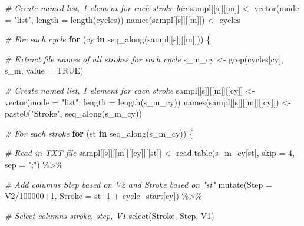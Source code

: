 \documentclass[
]{article}
\newenvironment{Shaded}{\begin{snugshade}}{\end{snugshade}}
\newcommand{\AttributeTok}[1]{\textcolor[rgb]{0.77,0.63,0.00}{#1}}
\newcommand{\CommentTok}[1]{\textcolor[rgb]{0.56,0.35,0.01}{\textit{#1}}}
\newcommand{\ConstantTok}[1]{\textcolor[rgb]{0.00,0.00,0.00}{#1}}
\newcommand{\ControlFlowTok}[1]{\textcolor[rgb]{0.13,0.29,0.53}{\textbf{#1}}}
\newcommand{\DecValTok}[1]{\textcolor[rgb]{0.00,0.00,0.81}{#1}}
\newcommand{\FunctionTok}[1]{\textcolor[rgb]{0.00,0.00,0.00}{#1}}
\newcommand{\NormalTok}[1]{#1}
\newcommand{\OtherTok}[1]{\textcolor[rgb]{0.56,0.35,0.01}{#1}}
\newcommand{\SpecialCharTok}[1]{\textcolor[rgb]{0.00,0.00,0.00}{#1}}
\newcommand{\StringTok}[1]{\textcolor[rgb]{0.31,0.60,0.02}{#1}}
\begin{document}
\begin{Shaded}
\begin{Highlighting}[]
    \CommentTok{\# Create named list, 1 element for each stroke bin}
\NormalTok{    sampl[[s]][[m]] }\OtherTok{\textless{}{-}} \FunctionTok{vector}\NormalTok{(}\AttributeTok{mode =} \StringTok{"list"}\NormalTok{, }\AttributeTok{length =} \FunctionTok{length}\NormalTok{(cycles))}
    \FunctionTok{names}\NormalTok{(sampl[[s]][[m]]) }\OtherTok{\textless{}{-}}\NormalTok{ cycles}
    
    \CommentTok{\# For each cycle}
    \ControlFlowTok{for}\NormalTok{ (cy }\ControlFlowTok{in} \FunctionTok{seq\_along}\NormalTok{(sampl[[s]][[m]])) \{}
      
      \CommentTok{\# Extract file names of all strokes for each cycle}
\NormalTok{      s\_m\_cy }\OtherTok{\textless{}{-}} \FunctionTok{grep}\NormalTok{(cycles[cy], s\_m, }\AttributeTok{value =} \ConstantTok{TRUE}\NormalTok{)}
     
      \CommentTok{\# Create named list, 1 element for each stroke}
\NormalTok{      sampl[[s]][[m]][[cy]] }\OtherTok{\textless{}{-}} \FunctionTok{vector}\NormalTok{(}\AttributeTok{mode =} \StringTok{"list"}\NormalTok{, }\AttributeTok{length =} \FunctionTok{length}\NormalTok{(s\_m\_cy))}
      \FunctionTok{names}\NormalTok{(sampl[[s]][[m]][[cy]]) }\OtherTok{\textless{}{-}} \FunctionTok{paste0}\NormalTok{(}\StringTok{"Stroke"}\NormalTok{, }\FunctionTok{seq\_along}\NormalTok{(s\_m\_cy))}
      
      \CommentTok{\# For each stroke}
      \ControlFlowTok{for}\NormalTok{ (st }\ControlFlowTok{in} \FunctionTok{seq\_along}\NormalTok{(s\_m\_cy)) \{}
     
        \CommentTok{\# Read in TXT file}
\NormalTok{        sampl[[s]][[m]][[cy]][[st]] }\OtherTok{\textless{}{-}} \FunctionTok{read.table}\NormalTok{(s\_m\_cy[st], }\AttributeTok{skip =} \DecValTok{4}\NormalTok{, }\AttributeTok{sep =} \StringTok{";"}\NormalTok{) }\SpecialCharTok{\%\textgreater{}\%} 
          
          \CommentTok{\# Add columns Step based on V2 and Stroke based on "st"}
          \FunctionTok{mutate}\NormalTok{(}\AttributeTok{Step =}\NormalTok{ V2}\SpecialCharTok{/}\DecValTok{100000}\SpecialCharTok{+}\DecValTok{1}\NormalTok{, }\AttributeTok{Stroke =}\NormalTok{ st }\SpecialCharTok{{-}}\DecValTok{1} \SpecialCharTok{+}\NormalTok{ cycle\_start[cy]) }\SpecialCharTok{\%\textgreater{}\%}    
          
          \CommentTok{\# Select columns stroke, step, V1}
          \FunctionTok{select}\NormalTok{(Stroke, Step, V1)}
        

\end{Highlighting}
\end{Shaded}
\end{document}
